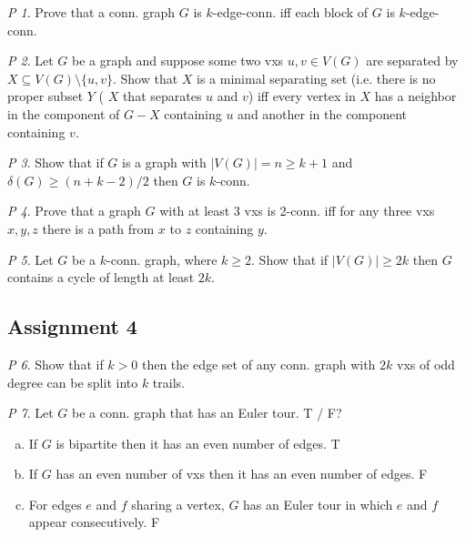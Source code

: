 \documentclass[11pt, fleqn, a4paper, landscape]{article}
\theoremstyle{plain} %
\theoremstyle{remark} %
\newtheorem{problem}{P}
\theoremstyle{definition} %
\begin{document}
\begin{multicols}{5}
\begin{problem}
Prove that a conn. graph $G$ is $k$-edge-conn. iff each block of $G$ is $k$-edge-conn.
\end{problem}

\begin{problem}
Let $G$ be a graph and suppose some two vxs $u, v \in V (G)$ are separated by $X \subseteq V (G)\setminus\{u,v\}$. Show that $X$ is a minimal separating set (i.e. there is no proper subset $Y$ ( $X$ that separates $u$ and $v$) iff every vertex in $X$ has a neighbor in the component
of $G-X$ containing $u$ and another in the component containing $v$.
\end{problem}

\begin{problem}
Show that if $G$ is a graph with $|V (G)| = n \ge k + 1$ and $\delta(G) \ge(n + k-2)/2$ then $G$ is $k$-conn.
\end{problem}

\begin{problem}
Prove that a graph $G$ with at least 3 vxs is 2-conn. iff for any three vxs $x, y, z$ there is a path from $x$ to $z$ containing $y$.
\end{problem}

\begin{problem}
Let $G$ be a $k$-conn. graph, where $k \ge 2$. Show that if $|V (G)| \ge 2k$ then $G$ contains a cycle of length at least $2k$.
\end{problem}

\subsection{Assignment 4}

\begin{problem}
Show that if $k > 0$ then the edge set of any conn. graph with $2k$ vxs of odd degree can be split into $k$ trails.
\end{problem}

\begin{problem}
Let $G$ be a conn. graph that has an Euler tour. T / F?
\begin{enumerate}[(a)]
\item If $G$ is bipartite then it has an even number of edges. T
\item If $G$ has an even number of vxs then it has an even number of edges. F
\item For edges $e$ and $f$ sharing a vertex, $G$ has an Euler tour in which $e$ and $f$ appear consecutively. F
\end{enumerate}
\end{problem}


\end{multicols}
\end{document}
